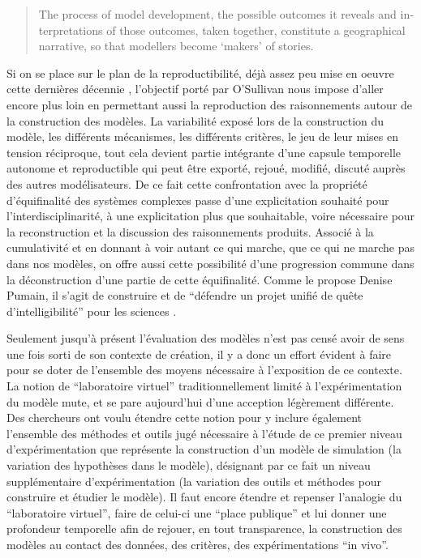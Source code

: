 \foreignblockquote{english}[\cite{OSullivan2004}]{The process of model development, the possible outcomes it reveals and interpretations of those outcomes, taken together, constitute a geographical narrative, so that modellers become ‘makers’ of stories.}

Si on se place sur le plan de la reproductibilité, déjà assez peu mise en oeuvre cette dernières décennie \autocite{Wilensky2007a}, l'objectif porté par O'Sullivan nous impose d'aller encore plus loin en permettant aussi la reproduction des raisonnements autour de la construction des modèles. La variabilité exposé lors de la construction du modèle, les différents mécanismes, les différents critères, le jeu de leur mises en tension réciproque, tout cela devient partie intégrante d'une capsule temporelle autonome et reproductible qui peut être exporté, rejoué, modifié, discuté auprès des autres modélisateurs. De ce fait cette confrontation avec la propriété d'équifinalité des systèmes complexes passe d'une explicitation souhaité pour l'interdisciplinarité, à une explicitation plus que souhaitable, voire nécessaire pour la reconstruction et la discussion des raisonnements produits. Associé à la cumulativité et en donnant à voir autant ce qui marche, que ce qui ne marche pas dans nos modèles, on offre aussi cette possibilité d'une progression commune dans la déconstruction d'une partie de cette équifinalité. Comme le propose Denise Pumain, il s'agit de construire et de \enquote{défendre un projet unifié de quête d'intelligibilité} pour les sciences \autocite[157-158]{Mathieu2014}. 

Seulement jusqu'à présent l'évaluation des modèles n'est pas censé avoir de sens une fois sorti de son contexte de création, il y a donc un effort évident à faire pour se doter de l'ensemble des moyens nécessaire à l'exposition de ce contexte. La notion de \enquote{laboratoire virtuel} traditionnellement limité à l'expérimentation du modèle mute, et se pare aujourd'hui d'une acception légèrement différente. Des chercheurs \autocites{Schmitt2014, Amblard2003} ont voulu étendre cette notion pour y inclure également l'ensemble des méthodes et outils jugé nécessaire à l'étude de ce premier niveau d'expérimentation que représente la construction d'un modèle de simulation (la variation des hypothèses dans le modèle), désignant par ce fait un niveau supplémentaire d’expérimentation (la variation des outils et méthodes pour construire et étudier le modèle).  Il faut encore étendre et repenser l'analogie du \enquote{laboratoire virtuel}, faire de celui-ci une \enquote{place publique} et lui donner une profondeur temporelle afin de rejouer, en tout transparence, la construction des modèles au contact des données, des critères, des expérimentations \foreignquote{latin}{in vivo}.

